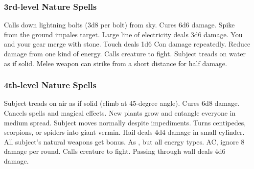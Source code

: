 \subsubsection{3rd-level Nature Spells}
\begin{spelllist}
     Calls down lightning bolts (3d8 per bolt) from sky.
     Cures 6d6 damage.
     Spike from the ground impales target.
     Large line of electricity deals 3d6 damage.
     You and your gear merge with stone.
     Touch deals 1d6 Con damage repeatedly.
     Reduce damage from one kind of energy.
     Calls creature to fight.
     Subject treads on water as if solid.
     Melee weapon can strike from a short distance for half damage.
\end{spelllist}

\subsubsection{4th-level Nature Spells}
\begin{spelllist}
     Subject treads on air as if solid (climb at 45-degree angle).
     Cures 6d8 damage.
     Cancels spells and magical effects.
     New plants grow and entangle everyone in medium spread.
     Subject moves normally despite impediments.
     Turns centipedes, scorpions, or spiders into giant vermin.
     Hail deals 4d4 damage in small cylinder.
     All subject's natural weapons get  bonus.
     As , but all energy types.
      AC, ignore 8 damage per round.
     Calls creature to fight.
     Passing through wall deals 4d6 damage.
\end{spelllist}

